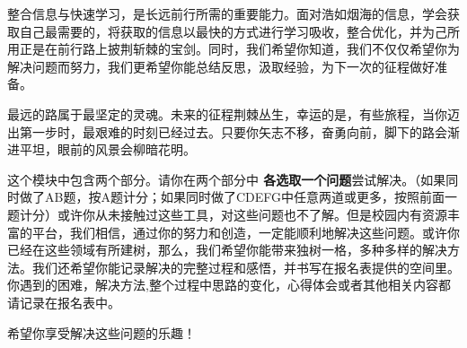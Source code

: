 \documentclass[12pt,a4paper]{article}
\begin{document}
\begin{ACEEmodule}{1.34}{\xiaosihao}{\kaishu}

整合信息与快速学习，是长远前行所需的重要能力。面对浩如烟海的信息，学会获取自己最需要的，将获取的信息以最快的方式进行学习吸收，整合优化，并为己所用正是在前行路上披荆斩棘的宝剑。同时，我们希望你知道，我们不仅仅希望你为解决问题而努力，我们更希望你能总结反思，汲取经验，为下一次的征程做好准备。

最远的路属于最坚定的灵魂。未来的征程荆棘丛生，幸运的是，有些旅程，当你迈出第一步时，最艰难的时刻已经过去。只要你矢志不移，奋勇向前，脚下的路会渐进平坦，眼前的风景会柳暗花明。
    
这个模块中包含两个部分。请你在两个部分中{\bf{\color{red} 各选取一个问题}}尝试解决。（如果同时做了AB题，按A题计分；如果同时做了CDEFG中任意两道或更多，按照前面一题计分）或许你从未接触过这些工具，对这些问题也不了解。但是校园内有资源丰富的平台，我们相信，通过你的努力和创造，一定能顺利地解决这些问题。或许你已经在这些领域有所建树，那么，我们希望你能带来独树一格，多种多样的解决方法。我们还希望你能记录解决的完整过程和感悟，并书写在报名表提供的空间里。你遇到的困难，解决方法,整个过程中思路的变化，心得体会或者其他相关内容都请记录在报名表中。

希望你享受解决这些问题的乐趣！

\end{ACEEmodule}		
\newpage

\end{document}
